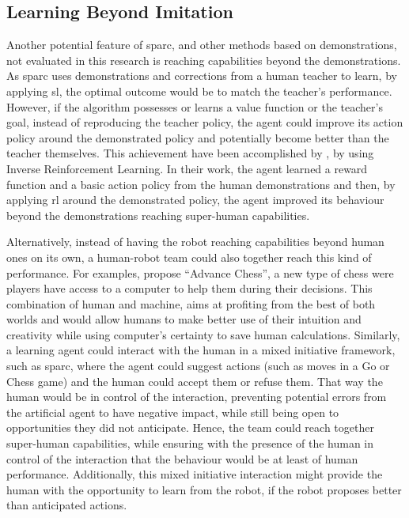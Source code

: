 
\subsection{Learning Beyond Imitation}\label{sec:disc_beyond}
Another potential feature of \gls{sparc}, and other methods based on demonstrations, not evaluated in this research is reaching capabilities beyond the demonstrations. As \gls{sparc} uses demonstrations and corrections from a human teacher to learn, by applying \gls{sl}, the optimal outcome would be to match the teacher's performance. However, if the algorithm possesses or learns a value function or the teacher's goal, instead of reproducing the teacher policy, the agent could improve its action policy around the demonstrated policy and potentially become better than the teacher themselves. This achievement have been accomplished by \cite{abbeel2004apprenticeship}, by using Inverse Reinforcement Learning. In their work, the agent learned a reward function and a basic action policy from the human demonstrations and then, by applying \gls{rl} around the demonstrated policy, the agent improved its behaviour beyond the demonstrations reaching super-human capabilities. 

Alternatively, instead of having the robot reaching capabilities beyond human ones on its own, a human-robot team could also together reach this kind of performance. For examples, \cite{kasparov2010chess} propose ``Advance Chess'', a new type of chess were players have access to a computer to help them during their decisions. This combination of human and machine, aims at profiting from the best of both worlds and would allow humans to make better use of their intuition and creativity while using computer's certainty to save human calculations. Similarly, a learning agent could interact with the human in a mixed initiative framework, such as \gls{sparc}, where the agent could suggest actions (such as moves in a Go or Chess game) and the human could accept them or refuse them. That way the human would be in control of the interaction, preventing potential errors from the artificial agent to have negative impact, while still being open to opportunities they did not anticipate. Hence, the team could reach together super-human capabilities, while ensuring with the presence of the human in control of the interaction that the behaviour would be at least of human performance. Additionally, this mixed initiative interaction might provide the human with the opportunity to learn from the robot, if the robot proposes better than anticipated actions.


